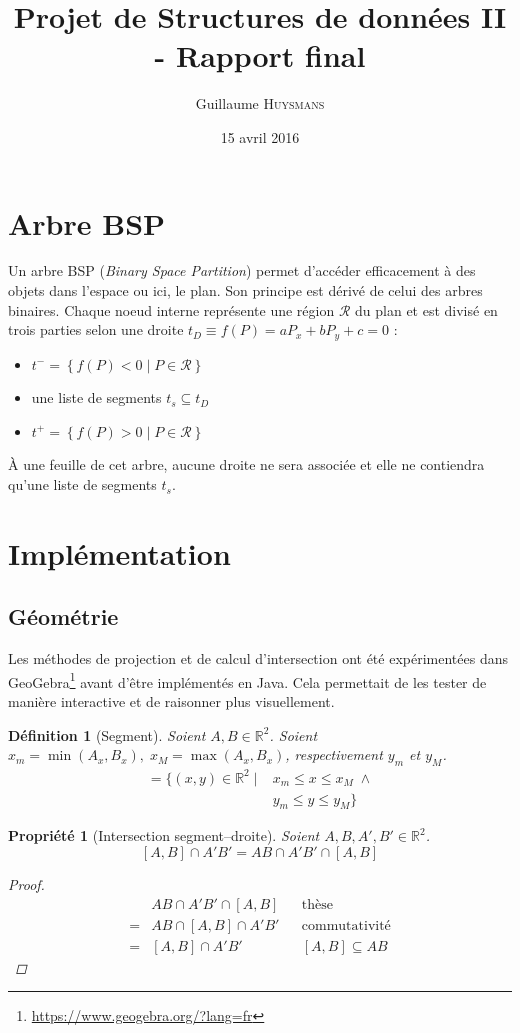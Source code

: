 \documentclass[12pt,twocolumn]{article}
\title{Projet de Structures de données II - Rapport final}
\author{Guillaume \textsc{Huysmans}}
\date{15 avril 2016}
\newtheorem{prop}{Propriété}
\newtheorem{dfn}{Définition}
\newcommand{\esR}{\mathbb{R}}
\newcommand{\reg}{\mathcal{R}}
\newcommand{\inc}{\subseteq}
\begin{document}
\maketitle


\section{Arbre BSP}
Un arbre BSP (\textit{Binary Space Partition}) permet d'accéder efficacement
à des objets dans l'espace ou ici, le plan. Son principe est dérivé de celui
des arbres binaires. Chaque noeud interne représente une région $\reg$
du plan et est divisé en trois parties selon
une droite $t_D\equiv f(P)=aP_x+bP_y+c=0$ :
\begin{itemize}
	\item $t^-=\left\{f(P)<0 \; | \; P\in\reg\right\}$
	\item une liste de segments $t_s \inc t_D$
	\item $t^+=\left\{f(P)>0 \; | \; P\in\reg\right\}$
\end{itemize}

À une feuille de cet arbre, aucune droite ne sera associée et elle ne
contiendra qu'une liste de segments $t_s$.


\section{Implémentation}
\subsection{Géométrie}
Les méthodes de projection et de calcul d'intersection ont été expérimentées dans
GeoGebra\footnote{\url{https://www.geogebra.org/?lang=fr}}
avant d'être implémentés en Java. Cela permettait de les tester de manière
interactive et de raisonner plus visuellement.

\begin{dfn}[Segment]\label{dfn:seg}
Soient $A,B\in\esR^2$.
Soient $x_m=\min(A_x,B_x), \; x_M=\max(A_x,B_x)$,
respectivement $y_m$ et $y_M$.
\begin{align*}
	[A,B]=\{(x,y)\in\esR^2 \; | \;
	& x_m\leq x\leq x_M \; \land \\
	& y_m\leq y\leq y_M \}
\end{align*}
\end{dfn}

\begin{prop}[Intersection segment--droite]\label{prop:inter}
Soient $A,B,A',B'\in\esR^2$.
\[
	[A,B] \cap A'B' = AB \cap A'B' \cap [A,B]
\]
\begin{proof}
\begin{align*}
	& AB \cap A'B' \cap [A,B] && \text{thèse} \\
	= & AB \cap [A,B] \cap A'B' && \text{commutativité} \\
	= & [A,B] \cap A'B' && [A,B] \inc AB
\end{align*}
\end{proof}
\end{prop}
\end{document}
